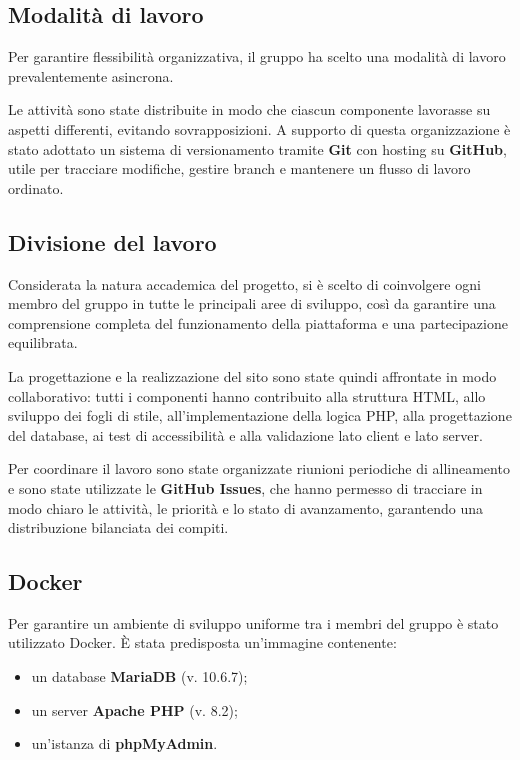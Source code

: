 \documentclass[a4paper,12pt]{article}
\begin{document}
\subsection{Modalità di lavoro}
Per garantire flessibilità organizzativa, il gruppo ha scelto una modalità di lavoro prevalentemente asincrona. 

Le attività sono state distribuite in modo che ciascun componente lavorasse su aspetti differenti, evitando sovrapposizioni. A supporto di questa organizzazione è stato adottato un sistema di versionamento tramite 
\textbf{Git} con hosting su 
\textbf{GitHub}, utile per tracciare modifiche, gestire branch e mantenere un flusso di lavoro ordinato.

\subsection{Divisione del lavoro}

Considerata la natura accademica del progetto, si è scelto di coinvolgere ogni membro del gruppo in tutte le principali aree di sviluppo, così da garantire una comprensione completa del funzionamento della piattaforma e una partecipazione equilibrata. 

La progettazione e la realizzazione del sito sono state quindi affrontate in modo collaborativo: tutti i componenti hanno contribuito alla struttura HTML, allo sviluppo dei fogli di stile, all’implementazione della logica PHP, alla progettazione del database, ai test di accessibilità e alla validazione lato client e lato server.

Per coordinare il lavoro sono state organizzate riunioni periodiche di allineamento e sono state utilizzate le \textbf{GitHub Issues}, che hanno permesso di tracciare in modo chiaro le attività, le priorità e lo stato di avanzamento, garantendo una distribuzione bilanciata dei compiti.

\subsection{Docker}

Per garantire un ambiente di sviluppo uniforme tra i membri del gruppo è stato utilizzato Docker.  
È stata predisposta un’immagine contenente:

\begin{itemize}
    \item un database \textbf{MariaDB} (v. 10.6.7);
    \item un server \textbf{Apache PHP} (v. 8.2);
    \item un’istanza di \textbf{phpMyAdmin}.
\end{itemize}
\end{document}
